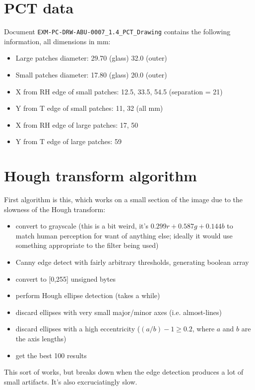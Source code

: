 
\section{PCT data}
Document \verb+EXM-PC-DRW-ABU-0007_1.4_PCT_Drawing+ contains the following information,
all dimensions in mm:

\begin{itemize}
\item Large patches diameter: 29.70 (glass) 32.0 (outer)
\item Small patches diameter: 17.80 (glass) 20.0 (outer)
\item X from RH edge of small patches: 12.5, 33.5, 54.5 (separation = 21)
\item Y from T edge of small patches: 11, 32 (all mm)
\item X from RH edge of large patches: 17, 50
\item Y from T edge of large patches: 59
\end{itemize}


\section{Hough transform algorithm}
First algorithm is this, which works on a small section of the image due to the
slowness of the Hough transform:
\begin{itemize}
\item convert to grayscale (this is a bit weird, it's
$0.299r+0.587g+0.144b$ to match human perception for want of anything else; ideally
it would use something appropriate to the filter being used)
\item Canny edge detect with fairly arbitrary thresholds, generating boolean array
\item convert to [0,255] unsigned bytes
\item perform Hough ellipse detection (takes a while)
\item discard ellipses with very small major/minor axes (i.e. almost-lines)
\item discard ellipses with a high eccentricity ($(a/b)-1 \ge 0.2$, where $a$ and $b$ are
the axis lengths)
\item get the best 100 results
\end{itemize}
This sort of works, but breaks down when the edge detection produces a lot of small artifacts.
It's also excruciatingly slow.

